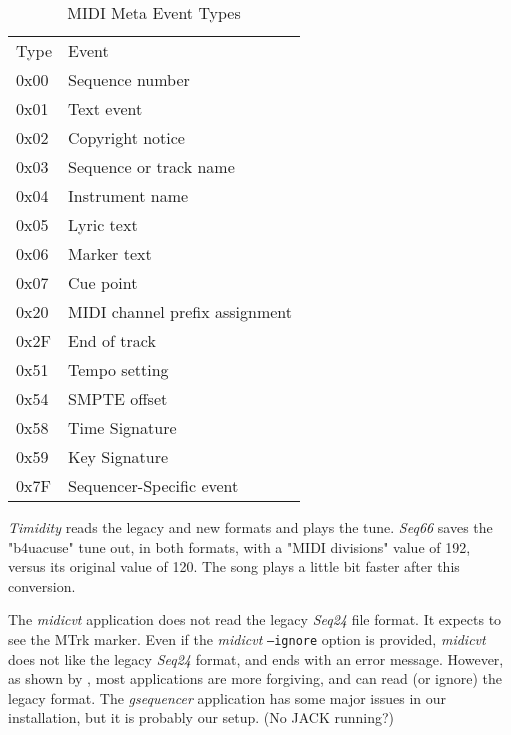    \begin{table}
      \centering
      \caption{MIDI Meta Event Types}
      \label{table:midi_meta_event_types}
      \begin{tabular}{l l}
         Type	& Event \\
         0x00	& Sequence number \\
         0x01	& Text event \\
         0x02	& Copyright notice \\
         0x03	& Sequence or track name \\
         0x04	& Instrument name \\
         0x05	& Lyric text \\
         0x06	& Marker text \\
         0x07	& Cue point \\
         0x20	& MIDI channel prefix assignment \\
         0x2F	& End of track \\
         0x51	& Tempo setting \\
         0x54	& SMPTE offset \\
         0x58	& Time Signature \\
         0x59	& Key Signature \\
         0x7F	& Sequencer-Specific event \\
      \end{tabular}
   \end{table}

   \textsl{Timidity} reads the legacy and new formats and plays the tune.
   \textsl{Seq66}  saves the "b4uacuse" tune out, in both formats,
   with a "MIDI divisions" value of 192, versus its original value of 120.
   The song plays a little bit faster after this conversion.

   The \textsl{midicvt} application does not read the legacy \textsl{Seq24}
   file format.  It
   expects to see the MTrk marker.  Even if the \textsl{midicvt}
   \texttt{--ignore} option is provided,
   \textsl{midicvt} does not like the legacy \textsl{Seq24} format, and ends
   with an error message.
   However, as shown by ,
   most applications are more
   forgiving, and can read (or ignore) the legacy format.  The
   \textsl{gsequencer} application has some major issues in our
   installation, but it is probably our setup.  (No JACK running?)

